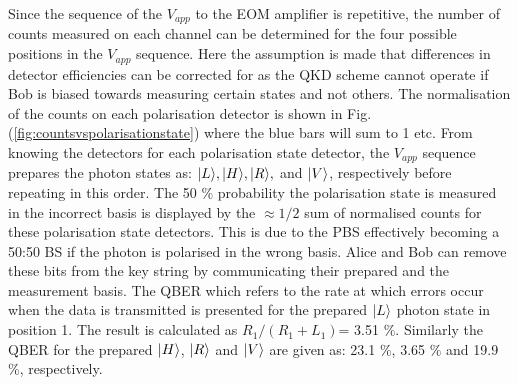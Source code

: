 Since the sequence of the $V_{app}$ to the EOM amplifier is repetitive, the number of counts measured on each channel can be determined for the four possible positions in the $V_{app}$ sequence. Here the assumption is made that differences in detector efficiencies can be corrected for as the QKD scheme cannot operate if Bob is biased towards measuring certain states and not others. The normalisation of the counts on each polarisation detector is shown in Fig. (\ref{fig:countsvspolarisationstate}) where the blue bars will sum to 1 etc. From knowing the detectors for each polarisation state detector, the $V_{app}$ sequence prepares the photon states as: $\lvert L\rangle,\lvert H\rangle,\lvert R\rangle,$ and $\lvert V\rangle$, respectively before repeating in this order. The 50 $\%$ probability the polarisation state is measured in the incorrect basis is displayed by the $\approx 1/2$ sum of normalised counts for these polarisation state detectors. This is due to the PBS effectively becoming a 50:50 BS if the photon is polarised in the wrong basis. Alice and Bob can remove these bits from the key string by communicating their prepared and the measurement basis. The QBER which refers to the rate at which errors occur when the data is transmitted is presented for the prepared $\lvert L\rangle$ photon state in position 1. The result is calculated as $R_{1}/(R_{1}+L_{1})$= 3.51 $\%$. Similarly the QBER for the prepared $\lvert H\rangle$, $\lvert R\rangle$ and $\lvert V\rangle$ are given as: 23.1 $\%$, 3.65 $\%$ and 19.9 $\%$, respectively. 



